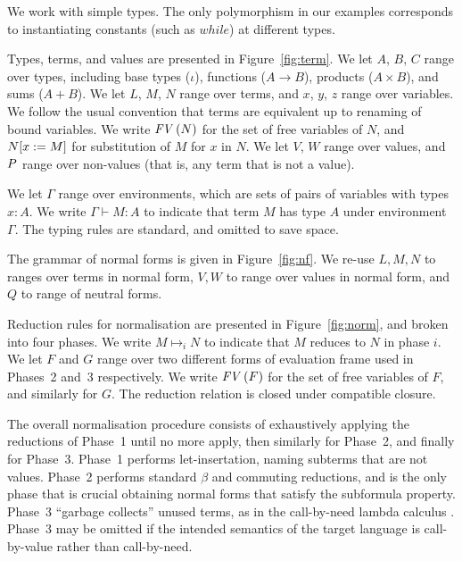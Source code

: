 We work with simple types. The only polymorphism in our examples
corresponds to instantiating constants (such as $\mathit{while}$) at
different types.

Types, terms, and values are presented in Figure~\ref{fig:term}. We
let $A$, $B$, $C$ range over types, including base types ($\iota$),
functions ($A \to B$), products ($A \times B$), and sums ($A + B$).
We let $L$, $M$, $N$ range over terms, and $x$, $y$, $z$ range over
variables. We follow the usual convention that terms are equivalent up
to renaming of bound variables. We write $\text{\textit{FV}}\,(N)$ for the set of free
variables of $N$, and $N[x:=M]$ for substitution of $M$ for $x$
in $N$.
%
%
We let $V$, $W$ range over values, and $P$ range over non-values
(that is, any term that is not a value).

We let $\Gamma$ range over environments, which are sets of pairs of
variables with types $x:A$. We write $\Gamma \vdash M:A$ to indicate
that term $M$ has type $A$ under environment $\Gamma$. The typing
rules are standard, and omitted to save space.


The grammar of normal forms is given in Figure~\ref{fig:nf}. We re-use
$L,M,N$ to ranges over terms in normal form, $V,W$ to range over
values in normal form, and $Q$ to range of neutral forms.

Reduction rules for normalisation are presented in
Figure~\ref{fig:norm}, and broken into four phases. We write $M
\mapsto_i N$ to indicate that $M$ reduces to $N$ in phase $i$. We let
$F$ and $G$ range over two different forms of evaluation frame used in
Phases~2 and~3 respectively. We write $\text{\textit{FV}}\,(F)$ for the set of free
variables of $F$, and similarly for $G$.
%
The reduction relation is closed under compatible closure.

The overall normalisation procedure consists of exhaustively applying
the reductions of Phase~1 until no more apply, then similarly for
Phase~2, and finally for Phase~3. Phase~1 performs let-insertation,
naming subterms that are not values.
Phase~2 performs standard $\beta$ and commuting reductions, and is the
only phase that is crucial obtaining normal forms that satisfy the
subformula property. Phase~3 ``garbage collects'' unused terms, as in
the call-by-need lambda calculus \citep{call-by-need}. Phase~3 may be
omitted if the intended semantics of the target language is
call-by-value rather than call-by-need.

